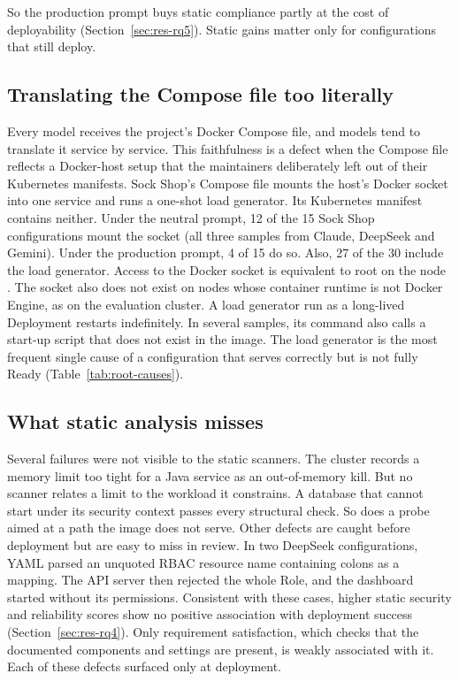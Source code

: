 So the production prompt buys static compliance partly at the cost of deployability (Section~\ref{sec:res-rq5}). Static gains matter only for configurations that still deploy.

\subsection{Translating the Compose file too literally}\label{sec:disc-compose}

Every model receives the project's Docker Compose file, and models tend to translate it service by service. This faithfulness is a defect when the Compose file reflects a Docker-host setup that the maintainers deliberately left out of their Kubernetes manifests. Sock Shop's Compose file mounts the host's Docker socket into one service and runs a one-shot load generator. Its Kubernetes manifest contains neither. Under the neutral prompt, 12 of the 15 Sock Shop configurations mount the socket (all three samples from Claude, DeepSeek and Gemini). Under the production prompt, 4 of 15 do so. Also, 27 of the 30 include the load generator. Access to the Docker socket is equivalent to root on the node \citep{rahman2023k8smisconfig}. The socket also does not exist on nodes whose container runtime is not Docker Engine, as on the evaluation cluster. A load generator run as a long-lived Deployment restarts indefinitely. In several samples, its command also calls a start-up script that does not exist in the image. The load generator is the most frequent single cause of a configuration that serves correctly but is not fully Ready (Table~\ref{tab:root-causes}).

\subsection{What static analysis misses}\label{sec:disc-static}

Several failures were not visible to the static scanners. The cluster records a memory limit too tight for a Java service as an out-of-memory kill. But no scanner relates a limit to the workload it constrains. A database that cannot start under its security context passes every structural check. So does a probe aimed at a path the image does not serve. Other defects are caught before deployment but are easy to miss in review. In two DeepSeek configurations, YAML parsed an unquoted RBAC resource name containing colons as a mapping. The API server then rejected the whole Role, and the dashboard started without its permissions. Consistent with these cases, higher static security and reliability scores show no positive association with deployment success (Section~\ref{sec:res-rq4}). Only requirement satisfaction, which checks that the documented components and settings are present, is weakly associated with it. Each of these defects surfaced only at deployment.

